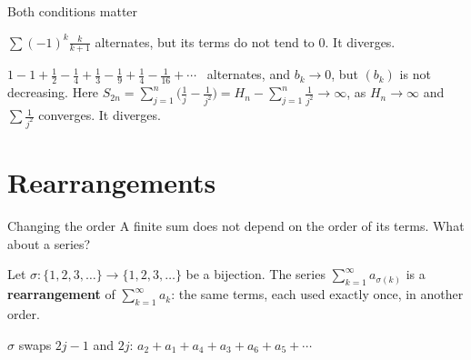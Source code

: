 \documentclass[10pt]{wosm-slides}
\begin{document}
\begin{frame}{Both conditions matter}
  \begin{warning}[$b_k \to 0$]
    $\sum (-1)^k \frac{k}{k+1}$ alternates, but its terms do not tend to $0$. It diverges.
  \end{warning}
  \pause
  \begin{warning}[$(b_k)$ decreasing]
    $1 - 1 + \frac12 - \frac14 + \frac13 - \frac19 + \frac14 - \frac1{16} + \cdots$
    \ alternates, and $b_k \to 0$, but $(b_k)$ is not decreasing. Here
    $S_{2n} = \sum_{j=1}^{n} \bigl(\frac1j - \frac1{j^2}\bigr) = H_n - \sum_{j=1}^{n} \frac1{j^2}
    \to \infty$, as $H_n \to \infty$ and $\sum \frac{1}{j^2}$ converges. It diverges.
  \end{warning}
\end{frame}


\section{Rearrangements}

\begin{frame}{Changing the order}
  A finite sum does not depend on the order of its terms. What about a series?
  \begin{definition}[Rearrangement]
    Let $\sigma\colon \{1, 2, 3, \dots\} \to \{1, 2, 3, \dots\}$ be a bijection.
    The series $\sum_{k=1}^\infty a_{\sigma(k)}$ is a \textbf{rearrangement} of
    $\sum_{k=1}^\infty a_k$: the same terms, each used exactly once, in another order.
  \end{definition}
  \pause
  \begin{example}
    $\sigma$ swaps $2j-1$ and $2j$:\quad
    $a_2 + a_1 + a_4 + a_3 + a_6 + a_5 + \cdots$
  \end{example}
\end{frame}
\end{document}
